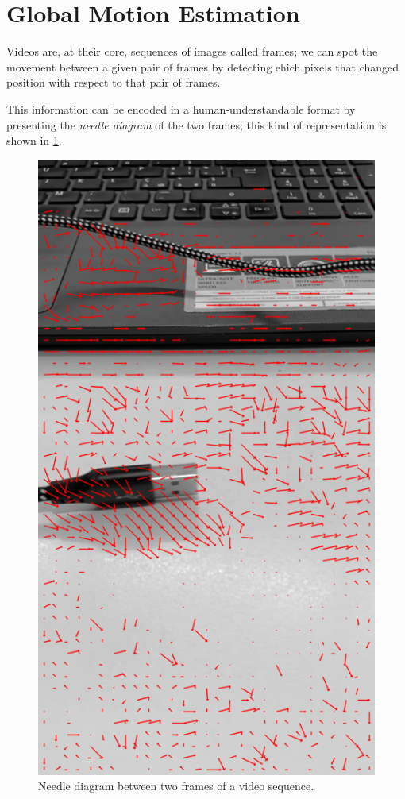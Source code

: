 \section{Global Motion Estimation}
\label{sec:02-gme}
Videos are, at their core, sequences of images called frames; we can spot the movement between a given pair of frames by detecting ehich pixels that changed position with respect to that pair of frames.


This information can be encoded in a human-understandable format by presenting the \textit{needle diagram} of the two frames; this kind of representation is shown in \cref{fig:needle-diagram}.

\begin{figure}
    \centering
    \includegraphics[width=.7\linewidth]{../assets/images/bbme-0-res.png}
    \caption{Needle diagram between two frames of a video sequence.}
    \label{fig:needle-diagram}
\end{figure}


